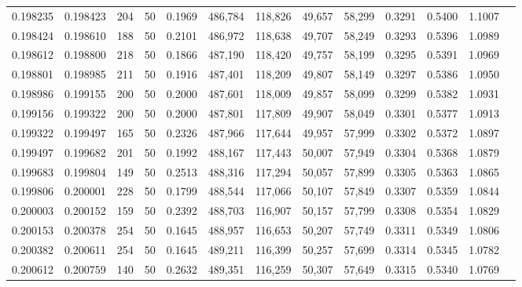 \begin{tabular}{rrrrrrrrrrrrr}
0.198235 & 0.198423 &   204 &  50 &                                     0.1969 & 486,784 & 118,826 &  49,657 &  58,299 & 0.3291 & 0.5400 & 1.1007 \\
0.198424 & 0.198610 &   188 &  50 &                                     0.2101 & 486,972 & 118,638 &  49,707 &  58,249 & 0.3293 & 0.5396 & 1.0989 \\
0.198612 & 0.198800 &   218 &  50 &                                     0.1866 & 487,190 & 118,420 &  49,757 &  58,199 & 0.3295 & 0.5391 & 1.0969 \\
0.198801 & 0.198985 &   211 &  50 &                                     0.1916 & 487,401 & 118,209 &  49,807 &  58,149 & 0.3297 & 0.5386 & 1.0950 \\
0.198986 & 0.199155 &   200 &  50 &                                     0.2000 & 487,601 & 118,009 &  49,857 &  58,099 & 0.3299 & 0.5382 & 1.0931 \\
0.199156 & 0.199322 &   200 &  50 &                                     0.2000 & 487,801 & 117,809 &  49,907 &  58,049 & 0.3301 & 0.5377 & 1.0913 \\
0.199322 & 0.199497 &   165 &  50 &                                     0.2326 & 487,966 & 117,644 &  49,957 &  57,999 & 0.3302 & 0.5372 & 1.0897 \\
0.199497 & 0.199682 &   201 &  50 &                                     0.1992 & 488,167 & 117,443 &  50,007 &  57,949 & 0.3304 & 0.5368 & 1.0879 \\
0.199683 & 0.199804 &   149 &  50 &                                     0.2513 & 488,316 & 117,294 &  50,057 &  57,899 & 0.3305 & 0.5363 & 1.0865 \\
0.199806 & 0.200001 &   228 &  50 &                                     0.1799 & 488,544 & 117,066 &  50,107 &  57,849 & 0.3307 & 0.5359 & 1.0844 \\
0.200003 & 0.200152 &   159 &  50 &                                     0.2392 & 488,703 & 116,907 &  50,157 &  57,799 & 0.3308 & 0.5354 & 1.0829 \\
0.200153 & 0.200378 &   254 &  50 &                                     0.1645 & 488,957 & 116,653 &  50,207 &  57,749 & 0.3311 & 0.5349 & 1.0806 \\
0.200382 & 0.200611 &   254 &  50 &                                     0.1645 & 489,211 & 116,399 &  50,257 &  57,699 & 0.3314 & 0.5345 & 1.0782 \\
0.200612 & 0.200759 &   140 &  50 &                                     0.2632 & 489,351 & 116,259 &  50,307 &  57,649 & 0.3315 & 0.5340 & 1.0769 \\

\end{tabular}
